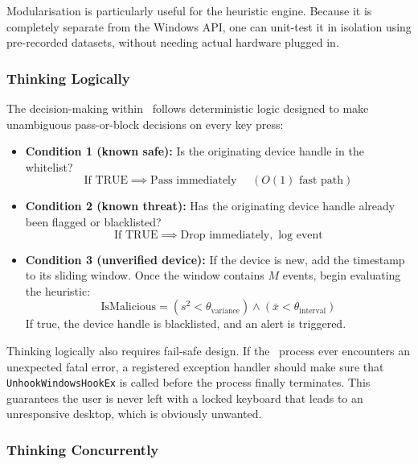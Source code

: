Modularisation is particularly useful for the heuristic engine. Because it is completely separate from the Windows API, one can unit-test it in isolation using pre-recorded datasets, without needing actual hardware plugged in.

\subsubsection{Thinking Logically}

The decision-making within \projectNameFormatted\ follows deterministic logic designed to make unambiguous pass-or-block decisions on every key press:

\begin{itemize}
	\item \textbf{Condition 1 (known safe):} Is the originating device handle in the whitelist?
	      \[\text{If TRUE} \implies \text{Pass immediately } \quad (O(1)\text{ fast path})\]
	\item \textbf{Condition 2 (known threat):} Has the originating device handle already been flagged or blacklisted?
	      \[\text{If TRUE} \implies \text{Drop immediately}, \text{ log event}\]
	\item \textbf{Condition 3 (unverified device):} If the device is new, add the timestamp to its sliding window. Once the window contains $M$ events, begin evaluating the heuristic:
	      \begin{equation}
		      \text{IsMalicious} = (s^2 < \theta_{\text{variance}}) \land (\bar{x} < \theta_{\text{interval}})
	      \end{equation}
	      If true, the device handle is blacklisted, and an alert is triggered.
\end{itemize}

\begin{note}
	Thinking logically also requires fail-safe design. If the \projectNameFormatted\ process ever encounters an unexpected fatal error, a registered exception handler should make sure that \texttt{UnhookWindowsHookEx} is called before the process finally terminates. This guarantees the user is never left with a locked keyboard that leads to an unresponsive desktop, which is obviously unwanted.
\end{note}

\subsubsection{Thinking Concurrently}

